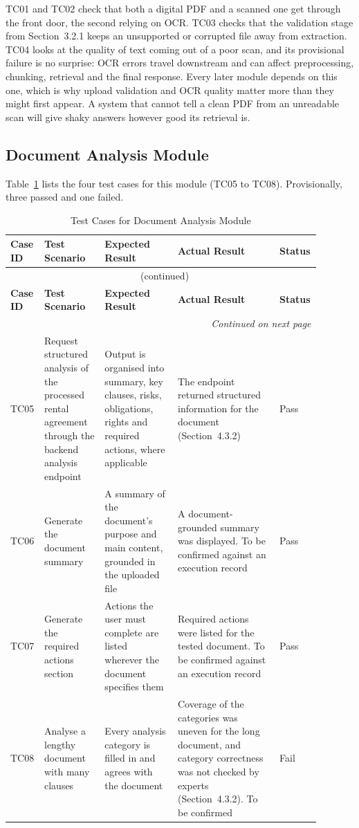 \documentclass[12pt,a4paper,oneside]{report}
\begin{document}
TC01 and TC02 check that both a digital PDF and a scanned one get through the front door, the second relying on OCR. TC03 checks that the validation stage from Section~3.2.1 keeps an unsupported or corrupted file away from extraction. TC04 looks at the quality of text coming out of a poor scan, and its provisional failure is no surprise: OCR errors travel downstream and can affect preprocessing, chunking, retrieval and the final response. Every later module depends on this one, which is why upload validation and OCR quality matter more than they might first appear. A system that cannot tell a clean PDF from an unreadable scan will give shaky answers however good its retrieval is.

\subsection{Document Analysis Module}
Table~\ref{tab:analysis} lists the four test cases for this module (TC05 to TC08). Provisionally, three passed and one failed.
{\footnotesize
\setlength{\tabcolsep}{3pt}
\renewcommand{\arraystretch}{1.15}
\begin{longtable}{|p{0.075\linewidth}|p{0.19\linewidth}|p{0.23\linewidth}|p{0.32\linewidth}|p{0.08\linewidth}|}
\caption{Test Cases for Document Analysis Module}\label{tab:analysis}\\
\hline
\textbf{Case ID} & \textbf{Test Scenario} & \textbf{Expected Result} & \textbf{Actual Result} & \textbf{Status}\\
\hline
\endfirsthead
\multicolumn{5}{c}{\tablename~\thetable{} (continued)}\\
\hline
\textbf{Case ID} & \textbf{Test Scenario} & \textbf{Expected Result} & \textbf{Actual Result} & \textbf{Status}\\
\hline
\endhead
\hline
\multicolumn{5}{r}{\emph{Continued on next page}}\\
\endfoot
\hline
\endlastfoot
TC05 & Request structured analysis of the processed rental agreement through the backend analysis endpoint & Output is organised into summary, key clauses, risks, obligations, rights and required actions, where applicable & The endpoint returned structured information for the document (Section~4.3.2) & Pass\\
\hline
TC06 & Generate the document summary & A summary of the document's purpose and main content, grounded in the uploaded file & A document-grounded summary was displayed. To be confirmed against an execution record & Pass\\
\hline
TC07 & Generate the required actions section & Actions the user must complete are listed wherever the document specifies them & Required actions were listed for the tested document. To be confirmed against an execution record & Pass\\
\hline
TC08 & Analyse a lengthy document with many clauses & Every analysis category is filled in and agrees with the document & Coverage of the categories was uneven for the long document, and category correctness was not checked by experts (Section~4.3.2). To be confirmed & Fail\\
\end{longtable}
}
\end{document}
